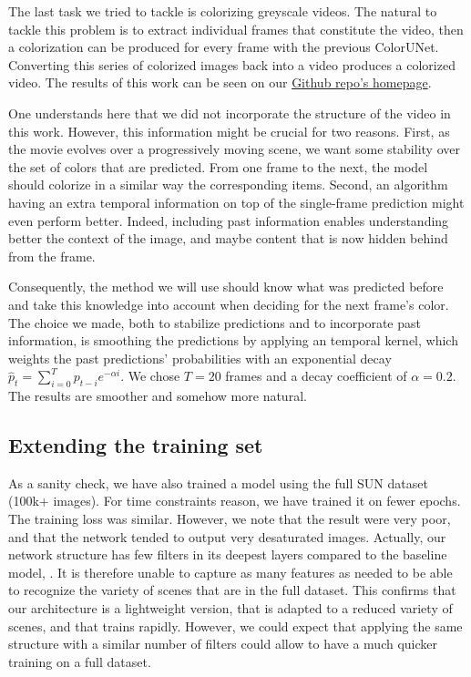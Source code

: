 \documentclass[10pt,twocolumn,letterpaper]{article}
\begin{document}
The last task we tried to tackle is colorizing greyscale videos. The natural to tackle this problem is to extract individual frames that constitute the video, then a colorization can be produced for every frame with the previous ColorUNet. Converting this series of colorized images back into a video produces a colorized video. The results of this work can be seen on our \href{https://github.com/vincentbillaut/all-colors-matter}{Github repo's homepage}.

One understands here that we did not incorporate the structure of the video in this work. However, this information might be crucial for two reasons. First, as the movie evolves over a progressively moving scene, we want some stability over the set of colors that are predicted. From one frame to the next, the model should colorize in a similar way the corresponding items. Second, an algorithm having an extra temporal information on top of the single-frame prediction might even perform better. Indeed, including past information enables understanding better the context of the image, and maybe content that is now hidden behind from the frame.

Consequently, the method we will use should know what was predicted before and take this knowledge into account when deciding for the next frame's color. The choice we made, both to stabilize predictions and to incorporate past information, is smoothing the predictions by applying an temporal kernel, which weights the past predictions' probabilities with an exponential decay $\hat p_t = \sum_{i = 0}^T p_{t-i} e^{-\alpha i}$. We chose $T=20$ frames and a decay coefficient of $\alpha=0.2$. The results are smoother and somehow more natural.

\subsection{Extending the training set}

As a sanity check, we have also trained a model using the full SUN dataset (100k+ images). For time constraints reason, we have trained it on fewer epochs. The training loss was similar. However, we note that the result were very poor, and that the network tended to output very desaturated images. Actually, our network structure has few filters in its deepest layers compared to the baseline model, \cite{zhang2016colorful}. It is therefore unable to capture as many features as needed to be able to recognize the variety of scenes that are in the full dataset. This confirms that our architecture is a lightweight version, that is adapted to a reduced variety of scenes, and that trains rapidly. However, we could expect that applying the same structure with a similar number of filters could allow to have a much quicker training on a full dataset. 
\end{document}
